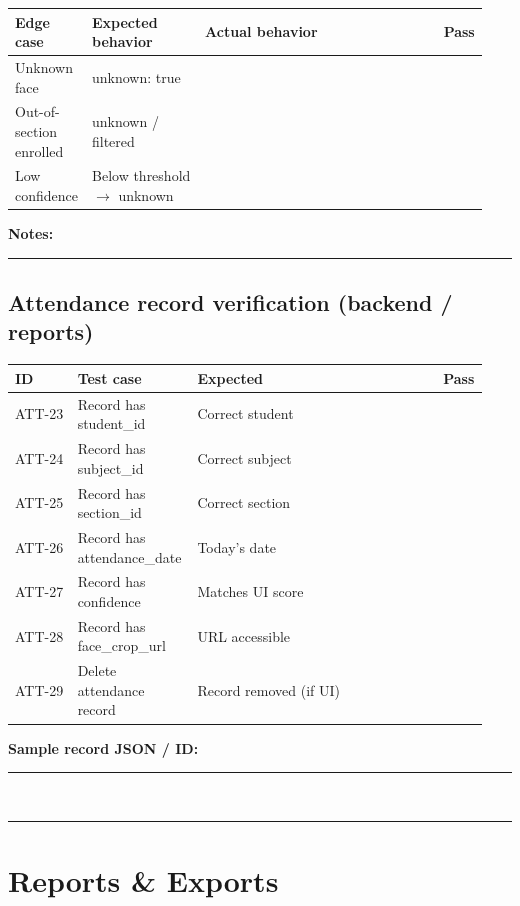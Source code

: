 \documentclass[11pt,a4paper,oneside]{article}
\newcommand{\chk}{\fbox{\rule{0pt}{1.05ex}\rule{1.05ex}{0pt}}}
\newcommand{\fillin}[1][3.5cm]{\rule{#1}{0.4pt}}
\newcommand{\fillinlong}{\rule{0.72\textwidth}{0.4pt}}
\newcommand{\notesblock}{\par\smallskip\noindent\textbf{Notes:}\ \fillinlong\par\smallskip}
\newcommand{\fieldline}[1]{\par\smallskip\noindent\textbf{#1}\ \fillin\par}
\newcommand{\tcheadfour}{%
  \toprule
  \textbf{ID} & \textbf{Test case} & \textbf{Expected} & \textbf{Pass} \\
  \midrule
}
\begin{document}
\smallskip
\small
\begin{tabular}{@{}>{\raggedright\arraybackslash}p{0.13\linewidth} >{\raggedright\arraybackslash}p{0.24\linewidth} >{\raggedright\arraybackslash}p{0.51\linewidth} >{\centering\arraybackslash}p{0.06\linewidth}@{}}
  \toprule
  \textbf{Edge case} & \textbf{Expected behavior} & \textbf{Actual behavior} & \textbf{Pass} \\
  \midrule
  Unknown face           & unknown: true                  & & \chk \\
  Out-of-section enrolled& unknown / filtered             & & \chk \\
  Low confidence         & Below threshold $\rightarrow$ unknown & & \chk \\
  \bottomrule
\end{tabular}
\normalsize

\notesblock

\subsection{Attendance record verification (backend / reports)}

\small
\begin{tabular}{@{}>{\raggedright\arraybackslash}p{0.13\linewidth} >{\raggedright\arraybackslash}p{0.24\linewidth} >{\raggedright\arraybackslash}p{0.51\linewidth} >{\centering\arraybackslash}p{0.06\linewidth}@{}}
  \tcheadfour
  ATT-23 & Record has student\_id   & Correct student           & \chk \\
  ATT-24 & Record has subject\_id   & Correct subject           & \chk \\
  ATT-25 & Record has section\_id   & Correct section           & \chk \\
  ATT-26 & Record has attendance\_date & Today's date           & \chk \\
  ATT-27 & Record has confidence    & Matches UI score          & \chk \\
  ATT-28 & Record has face\_crop\_url & URL accessible          & \chk \\
  ATT-29 & Delete attendance record & Record removed (if UI)    & \chk \\
  \bottomrule
\end{tabular}
\normalsize

\fieldline{Sample record JSON / ID:}
\fieldline{}

\section{Reports \& Exports}
\end{document}
